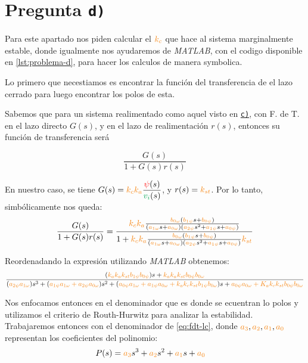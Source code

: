 \section{Pregunta \texttt{d)}}\label{pregunta-d}

Para este apartado nos piden calcular el $\nara{k_{c}}$ que hace al sistema
marginalmente estable, donde igualmente nos ayudaremos de \textit{MATLAB}, con
el codigo disponible en \autoref{lst:problema-d}, para hacer los calculos
de manera symbolica.

Lo primero que necestiamos es encontrar la función del transferencia de el lazo
cerrado para luego encontrar los polos de esta.

Sabemos que para un sistema realimentado como aquel visto en \hyperref[pregunta-c]{\texttt{c)}},
con F. de T. en el lazo directo $G(s)$, y en el lazo de realimentación $r(s)$,
entonces su función de transferencia será

\begin{equation}
    \frac{G(s)}{1 + G(s)r(s)}
\end{equation}

En nuestro caso, se tiene $G(s) = \nara{k_{c} k_{a}} \dfrac{\rojo{\psi}(s)}{\verd{v_i}(s)}$,
y $r(s) = \nara{k_{st}}$. Por lo tanto, simbólicamente nos queda:
\begin{equation}
    \frac{G(s)}{1 + G(s)r(s)} = \dfrac{\nara{k_ck_a} \frac{\nara{\nara{b_{0\omega}}}\left(\nara{b_{1\psi}}s + \nara{b_{0\psi}}\right)}
    {\left(\nara{a_{1\omega}}s + \nara{a_{0\omega}}\right)\left(\nara{a_{2\psi}}s^{2} + \nara{a_{1\psi}}s + \nara{a_{0\psi}}\right)}}{1+\nara{k_ck_a} \frac{\nara{\nara{b_{0\omega}}}\left(\nara{b_{1\psi}}s + \nara{b_{0\psi}}\right)}
    {\left(\nara{a_{1\omega}}s + \nara{a_{0\omega}}\right)\left(\nara{a_{2\psi}}s^{2} + \nara{a_{1\psi}}s + \nara{a_{0\psi}}\right)}\nara{k_{st}}}
\end{equation}

Reordenadando la expresión utilizando \textit{MATLAB} obtenemos:
\begin{equation}\label{eq:fdt-lc}
    \frac{(\nara{k_a k_a k_{st} b_{1\psi} b_{0\psi}})s + \nara{k_a k_a k_{st} b_{0\psi} b_{0\omega}}}{(\nara{a_{2\psi} a_{1\omega}})s^3 + (\nara{a_{1\psi} a_{1\omega} + a_{2\psi} a_{0\omega}})s^2 + (\nara{a_{0\psi} a_{1\omega} + a_{1\psi} a_{0\omega} + k_a k_c k_{st} b_{1\psi} b_{0\omega}})s + \nara{a_{0\psi} a_{0\omega} + K_a k_c k_{st} b_{0\psi} b_{0\omega}}}
\end{equation}

Nos enfocamos entonces en el denominador que es donde se ecuentran lo polos y
utilizamos el criterio de Routh-Hurwitz para analizar la estabilidad. Trabajaremos
entonces con el denominador de \eqref{eq:fdt-lc}, donde $\nara{a_3},\nara{a_2},\nara{a_1},\nara{a_0}$
representan los coeficientes del polinomio:
\begin{align}
    P(s) = \nara{a_3} s^3 + \nara{a_2} s^2 + \nara{a_1} s + \nara{a_0} &
\end{align}

